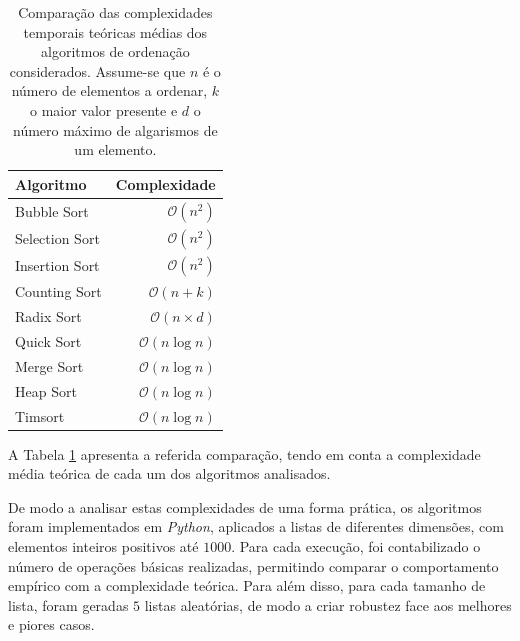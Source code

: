 \documentclass[conference]{IEEEtran}
\begin{document}
\begin{table}[H]
\centering
\caption{Comparação das complexidades temporais teóricas médias dos algoritmos de ordenação considerados. Assume-se que \( n \) é o número de elementos a ordenar, \( k \) o maior valor presente e \( d \) o número máximo de algarismos de um elemento.}
\label{tab:complexidades}
\begin{tabular}{lr}
\toprule
\textbf{Algoritmo} & \textbf{Complexidade} \\
\midrule
Bubble Sort & $\mathcal{O}(n^2)$ \\
Selection Sort & $\mathcal{O}(n^2)$ \\
Insertion Sort & $\mathcal{O}(n^2)$ \\
Counting Sort & $\mathcal{O}(n + k)$ \\
Radix Sort & $\mathcal{O}(n \times d)$ \\
Quick Sort & $\mathcal{O}(n \log n)$ \\
Merge Sort & $\mathcal{O}(n \log n)$ \\
Heap Sort & $\mathcal{O}(n \log n)$ \\
Timsort & $\mathcal{O}(n \log n)$ \\
\bottomrule
\end{tabular}
\end{table}

A Tabela \ref{tab:complexidades} apresenta a referida comparação, tendo em conta a complexidade média teórica de cada um dos algoritmos analisados.

De modo a analisar estas complexidades de uma forma prática, os algoritmos foram implementados em \textit{Python}, aplicados a listas de diferentes dimensões, com elementos inteiros positivos até $1000$. Para cada execução, foi contabilizado o número de operações básicas realizadas, permitindo comparar o comportamento empírico com a complexidade teórica. Para além disso, para cada tamanho de lista, foram geradas $5$ listas aleatórias, de modo a criar robustez face aos melhores e piores casos.
\end{document}
